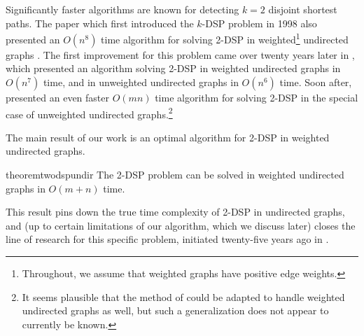 \documentclass[11pt]{article}
\theoremstyle{definition}
\newcommand\nicole[1]{\textcolor{red}{Nicole says: #1}}
\begin{document}
Significantly faster algorithms are known for detecting $k=2$ disjoint shortest paths.
The paper which first introduced the \textsf{$k$-DSP} problem in 1998 also presented an $O(n^8)$ time algorithm for solving \textsf{2-DSP} in weighted\footnote{Throughout, we assume that weighted graphs have positive edge weights.} undirected graphs \cite{Tzoreff1998}.
The first improvement for this problem came over twenty years later in \cite{Akhmedov2020}, 
which presented an algorithm solving \textsf{2-DSP} in weighted undirected graphs in $O(n^7)$ time, and in unweighted undirected graphs in $O(n^6)$ time.
Soon after, \cite[Theorem 1]{Geometric-Lens-conf} presented an even faster $O(mn)$ time algorithm for solving \textsf{2-DSP} in the special case of unweighted undirected graphs.\footnote{It seems plausible that the method of \cite{Geometric-Lens-conf} could be adapted to handle weighted undirected graphs as well, but such a generalization does not appear to currently be known.}

The main result of our work is an optimal algorithm for \textsf{2-DSP} in weighted undirected graphs.


\begin{restatable}{theorem}{twodspundir}
    \label{2dsp-undir}
    The \textsf{2-DSP} problem can be solved in weighted undirected graphs in $O(m+n)$ time.
\end{restatable}



This result pins down the true time complexity of \textsf{2-DSP} in undirected graphs, and (up to certain limitations of our algorithm, which we discuss later) closes the line of research for this specific problem, initiated twenty-five years ago in \cite{Tzoreff1998}.
\end{document}
